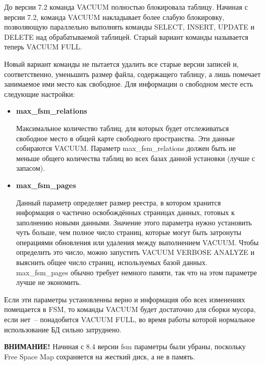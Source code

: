 До версии 7.2 команда VACUUM полностью блокировала таблицу. Начиная с версии 7.2, команда VACUUM накладывает более слабую 
блокировку, позволяющую параллельно выполнять команды SELECT, INSERT, UPDATE и DELETE над обрабатываемой таблицей. 
Старый вариант команды называется теперь VACUUM FULL.

Новый вариант команды не пытается удалить все старые версии записей и, соответственно, уменьшить размер файла, содержащего таблицу, 
а лишь помечает занимаемое ими место как свободное. Для информации о свободном месте есть следующие настройки:
\begin{itemize}
\item \textbf{max\_fsm\_relations}

Максимальное количество таблиц, для которых будет отслеживаться свободное место в общей карте свободного пространства. 
Эти данные собираются VACUUM. Параметр max\_fsm\_relations должен быть не меньше общего количества таблиц во всех 
базах данной установки (лучше с запасом). 

\item \textbf{max\_fsm\_pages}

Данный параметр определяет размер реестра, в котором хранится информация о частично освобождённых страницах данных, 
готовых к заполнению новыми данными. Значение этого параметра нужно установить чуть больше, чем полное число страниц, 
которые могут быть затронуты 
операциями обновления или удаления между выполнением VACUUM. Чтобы определить это число, можно запустить VACUUM VERBOSE ANALYZE 
и выяснить общее число страниц, используемых базой данных. max\_fsm\_pages обычно требует немного памяти, так что на этом 
параметре лучше не экономить. 
\end{itemize}

Если эти параметры установленны верно и информация обо всех изменениях помещается в FSM, 
то команды VACUUM будет достаточно для сборки мусора, если нет~-- понадобится
VACUUM FULL, во время работы которой нормальное использование БД сильно затруднено.

\textbf{ВНИМАНИЕ!} Начиная с 8.4 версии fsm параметры были убраны, поскольку Free Space Map сохраняется на жесткий диск, а не в память.


